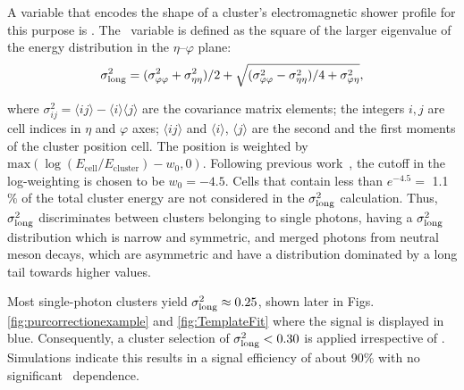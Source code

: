 A variable that encodes the shape of a cluster's electromagnetic shower profile for this purpose is \lambdasquare. 
The \lambdasquare~variable is defined as the square of the larger eigenvalue of the energy distribution in the $\eta$--$\varphi$ plane:
\begin{equation}
\sigma^{2}_{\mathrm{long}} = (\sigma^{2}_{\varphi\varphi} + \sigma^{2}_{\eta\eta})/2 + \sqrt{(\sigma^{2}_{\varphi\varphi} - \sigma^{2}_{\eta\eta})/4 + \sigma^{2}_{\varphi\eta}},
\end{equation}

where $\sigma^{2}_{ij} = \langle ij \rangle - \langle i \rangle\langle j \rangle$ are the covariance matrix elements; the integers $i,j$ are cell indices in $\eta$ and  $\varphi$ axes; $\langle ij \rangle$ and $\langle i\rangle$, $\langle j\rangle$ are the second and the first moments of the cluster position cell. The position is weighted by $\mathrm{max}\left(\log(E_{\mathrm{cell}}/E_{\mathrm{cluster}}) - w_{0},0\right).$ Following previous work~\cite{Acharya:2018dqe}, the cutoff in the log-weighting is chosen to be $w_{0}=-4.5$. Cells that contain less than {$e^{-4.5} =$ 1.1$\%$} of the total cluster energy are not considered in the $\sigma^{2}_{\mathrm{long}}$ calculation. Thus, $\sigma^{2}_{\mathrm{long}}$ discriminates between clusters belonging to single photons, having a $\sigma^{2}_{\mathrm{long}}$ distribution which is narrow and symmetric, and merged photons from neutral meson decays, which are asymmetric and have a distribution dominated by a long tail towards higher values. 

Most single-photon clusters yield $\sigma^{2}_{\mathrm{long}}\approx 0.25$, shown later in Figs. \ref{fig:purcorrectionexample} and \ref{fig:TemplateFit} where the signal is displayed in blue. Consequently, a cluster selection of $\sigma^{2}_{\mathrm{long}}<0.30$ is applied irrespective of \pt. Simulations indicate this results in a signal efficiency of about 90$\%$ with no significant \pt~dependence.



